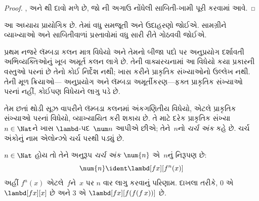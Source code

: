 \begin{proof}
  ,  અને
  થી દાવો મળે છે, જો
  ની અગાઉ નોંધેલી સાબિતી-ખામી
  પૂરી કરવામાં આવે.
\end{proof}
\endgroup


\OLEndChapterHook
\endgroup


\begingroup
\makeatletter{}\makeatother

\label{guunit:OLP-0373}


\begin{editorial}
  આ અધ્યાય પ્રાયોગિક છે. તેમાં વધુ સમજૂતી અને
  ઉદાહરણો જોઈએ. સામગ્રીને વ્યાખ્યાઓ અને
  સાબિતીવાળાં પ્રસ્તાવોમાં વધુ સારી રીતે ગોઠવવી
  જોઈએ.
\end{editorial}

\begingroup
\makeatletter{}\makeatother

\label{guunit:OLP-0374}


પ્રથમ નજરે લૅમ્બડા કલન માત્ર વિધેયો અને તેમનો બીજા
પદો પર અનુપ્રયોગ દર્શાવતી અભિવ્યક્તિઓનું ખૂબ અમૂર્ત
કલન લાગે છે. તેની વાક્યરચનામાં આ વિધેયો કયા પ્રકારની
વસ્તુઓ પરનાં છે તેનો કોઈ નિર્દેશ નથી; ખાસ કરીને
પ્રાકૃતિક સંખ્યાઓનો ઉલ્લેખ નથી. તેની મૂળ ક્રિયાઓ—
અનુપ્રયોગ અને લૅમ્બડા અમૂર્તીકરણ—ફક્ત પ્રાકૃતિક
સંખ્યાઓ પરનાં નહીં, કોઈપણ વિધેયને લાગુ પડે છે.

તેમ છતાં થોડી સૂઝ વાપરીને લૅમ્બડા કલનમાં
અંકગણિતીય વિધેયો, એટલે પ્રાકૃતિક સંખ્યાઓ પરનાં
વિધેયો, વ્યાખ્યાયિત કરી શકાય છે. તે માટે દરેક
પ્રાકૃતિક સંખ્યા~$n \in \Nat$ને ખાસ
$\lambd$-પદ~$\num n$ આપીએ છીએ; તેને~$n$નો
\emph{ચર્ચ અંક} કહે છે. ચર્ચ અંકોનું નામ એલોન્ઝો
ચર્ચ પરથી પડ્યું છે.

\begin{defn}
  $n \in \Nat$ હોય તો તેને અનુરૂપ \emph{ચર્ચ અંક}
  $\num{n}$ એ~$n$નું નિરૂપણ છે:
  \[
    \num{n} \ident \lambd[fx][f^n(x)]
  \]
  અહીં $f^n(x)$ એટલે~$f$ને~$x$ પર $n$ વાર
  લાગુ કરવાનું પરિણામ. દાખલા તરીકે,
  $\num{0}$ એ $\lambd[fx][x]$ છે અને
  $\num{3}$ એ $\lambd[fx][f(f(f\,x))]$ છે.
\end{defn}
  
